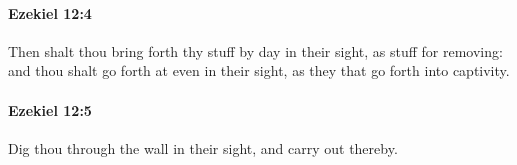 		\paragraph{Ezekiel 12:4} %
			\label{EZEKIEL-12-4}

			Then shalt thou bring forth thy stuff by day in their sight, as stuff for removing: and thou shalt go forth at even in their sight, as they that go forth into captivity.


		\paragraph{Ezekiel 12:5} %
			\label{EZEKIEL-12-5}

			Dig thou through the wall in their sight, and carry out thereby.


